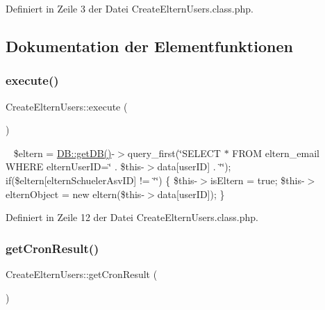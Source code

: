Definiert in Zeile 3 der Datei Create\+Eltern\+Users.\+class.\+php.



\subsection{Dokumentation der Elementfunktionen}
\mbox{\label{class_create_eltern_users_a23e592ee1b2064bd81504b3a18cc07aa}} 
\subsubsection{\texorpdfstring{execute()}{execute()}}
{\footnotesize\ttfamily Create\+Eltern\+Users\+::execute (\begin{DoxyParamCaption}{ }\end{DoxyParamCaption})}

~\newline
\$eltern = \mbox{\hyperlink{class_d_b_a1f39c0489afad64328534850308fc9a9}{D\+B\+::get\+D\+B()}}-\/$>$query\+\_\+first(\char`\"{}\+S\+E\+L\+E\+C\+T $\ast$ F\+R\+O\+M eltern\+\_\+email W\+H\+E\+R\+E eltern\+User\+I\+D=\textquotesingle{}\char`\"{} . \$this-\/$>$data\mbox{[}\textquotesingle{}user\+ID\textquotesingle{}\mbox{]} . \char`\"{}\textquotesingle{}\char`\"{}); if(\$eltern\mbox{[}\textquotesingle{}eltern\+Schueler\+Asv\+ID\textquotesingle{}\mbox{]} != \char`\"{}\char`\"{}) \{ \$this-\/$>$is\+Eltern = true; \$this-\/$>$eltern\+Object = new eltern(\$this-\/$>$data\mbox{[}\textquotesingle{}user\+ID\textquotesingle{}\mbox{]}); \} 

Definiert in Zeile 12 der Datei Create\+Eltern\+Users.\+class.\+php.

\mbox{\label{class_create_eltern_users_a60620ffbb7020ed8b25c767ffe9495d9}} 
\subsubsection{\texorpdfstring{get\+Cron\+Result()}{getCronResult()}}
{\footnotesize\ttfamily Create\+Eltern\+Users\+::get\+Cron\+Result (\begin{DoxyParamCaption}{ }\end{DoxyParamCaption})}

